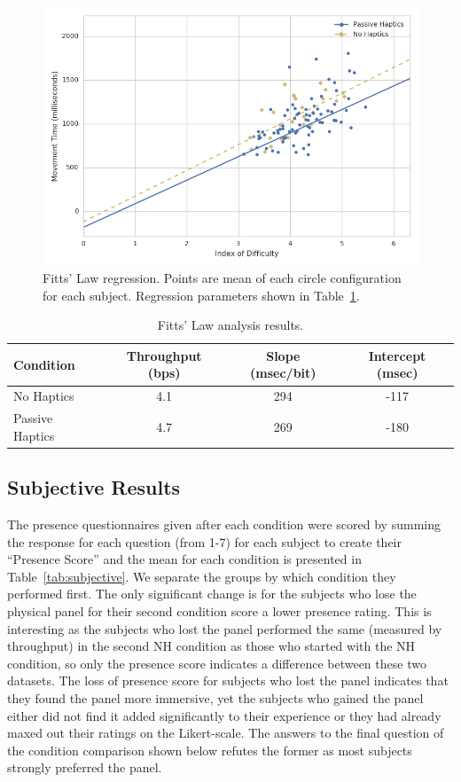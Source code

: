 \documentclass[]{aiaa-tc}%
\begin{document}
\begin{figure}[htb]
  \centering
  \includegraphics{figures/fitts.png}
  \caption{Fitts' Law regression. Points are mean of each circle configuration for each subject. Regression parameters shown in Table~\ref{tab:fitts}.}
  \label{fig:fitts}
\end{figure}

\begin{table}
  \centering
  \begin{tabular}{lccc}
    Condition &  Throughput (bps) &  Slope (msec/bit) &  Intercept (msec) \\
    \hline\hline
    No Haptics  &          4.1 &        294 &       -117 \\
    Passive Haptics &          4.7 &        269 &       -180 \\
  \end{tabular}
  \caption{Fitts' Law analysis results.}
  \label{tab:fitts}
\end{table}

\subsection{Subjective Results}

The presence questionnaires given after each condition were scored by summing the response for each question (from 1-7) for each subject to create their ``Presence Score'' and the mean for each condition is presented in Table~\ref{tab:subjective}.
We separate the groups by which condition they performed first.
The only significant change is for the subjects who lose the physical panel for their second condition score a lower presence rating.
This is interesting as the subjects who lost the panel performed the same (measured by throughput) in the second NH condition as those who started with the NH condition, so only the presence score indicates a difference between these two datasets.
The loss of presence score for subjects who lost the panel indicates that they found the panel more immersive, yet the subjects who gained the panel either did not find it added significantly to their experience or they had already maxed out their ratings on the Likert-scale.
The answers to the final question of the condition comparison shown below refutes the former as most subjects strongly preferred the panel.
\end{document}
